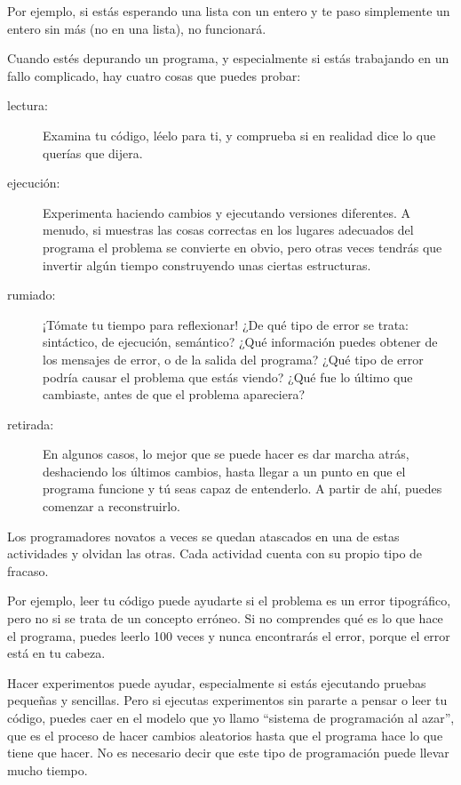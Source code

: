 Por ejemplo, si estás esperando una lista con un entero y te
paso simplemente un entero sin más (no en una lista), no funcionará.

Cuando estés depurando un programa, y especialmente si estás
trabajando en un fallo complicado, hay cuatro cosas que puedes probar:

\begin{description}

\item[lectura:] Examina tu código, léelo para ti, y comprueba
si en realidad dice lo que querías que dijera.

\item[ejecución:] Experimenta haciendo cambios y ejecutando versiones
diferentes. A menudo, si muestras las cosas correctas en los lugares
adecuados del programa el problema se convierte en obvio, pero otras veces
tendrás que invertir algún tiempo construyendo unas ciertas estructuras.

\item[rumiado:] ¡Tómate tu tiempo para reflexionar! ¿De qué tipo de error
se trata: sintáctico, de ejecución, semántico? ¿Qué información puedes obtener de
los mensajes de error, o de la salida del programa? ¿Qué tipo de
error podría causar el problema que estás viendo? ¿Qué fue lo último
que cambiaste, antes de que el problema apareciera?

\item[retirada:] En algunos casos, lo mejor que se puede hacer
es dar marcha atrás, deshaciendo los últimos cambios, hasta llegar
a un punto en que el programa funcione y tú seas capaz de entenderlo. A partir de ahí,
puedes comenzar a reconstruirlo.

\end{description}

Los programadores novatos a veces se quedan atascados en una de estas actividades
y olvidan las otras. Cada actividad cuenta con su propio tipo
de fracaso.


Por ejemplo, leer tu código puede ayudarte si el problema es un
error tipográfico, pero no si se trata de un concepto
erróneo. Si no comprendes qué es lo que hace el programa, puedes
leerlo 100 veces y nunca encontrarás el error, porque el error está en
tu cabeza.


Hacer experimentos puede ayudar, especialmente si estás ejecutando
pruebas pequeñas y sencillas. Pero si ejecutas experimentos sin pararte a pensar
o leer tu código, puedes caer en el modelo que yo llamo ``sistema de programación al azar'',
que es el proceso de hacer cambios aleatorios hasta que el programa
hace lo que tiene que hacer. No es necesario decir que este tipo de programación
puede llevar mucho tiempo.

